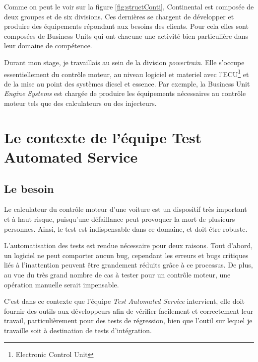 		Comme on peut le voir sur la figure \ref{fig:structConti}, Continental est composée de deux groupes et de six divisions. Ces dernières se chargent de développer et produire des équipements répondant aux besoins des clients. Pour cela elles sont composées de Business Units qui ont chacune une activité bien particulière dans leur domaine de compétence. 

Durant mon stage, je travaillais au sein de la division \textit{powertrain}. Elle s'occupe essentiellement du contrôle moteur, au niveau logiciel et materiel avec l'ECU\footnote{Electronic Control Unit} et de la mise au point des systèmes diesel et essence. Par exemple, la Business Unit \textit{Engine Systems} est chargée de produire les équipements nécessaires au contrôle moteur tels que des calculateurs ou des injecteurs.

	\section{Le contexte de l'équipe Test Automated Service}
		
 		\subsection{Le besoin} \label{besoinTests}
 		Le calculateur du contrôle moteur d'une voiture est un dispositif très important et à haut risque, puisqu'une défaillance peut provoquer la mort de plusieurs personnes. Ainsi, le test est indispensable dans ce domaine, et doit être robuste. 

L'automatisation des tests est rendue nécessaire pour deux raisons. Tout d'abord, un logiciel ne peut comporter aucun bug, cependant les erreurs et bugs critiques liés à l'inattention peuvent être grandement réduits grâce à ce processus. De plus, au vue du très grand nombre de cas à tester pour un contrôle moteur, une opération manuelle serait impensable. 

C'est dans ce contexte que l'équipe \textit{Test Automated Service} intervient, elle doit fournir des outils aux développeurs afin de vérifier facilement et correctement leur travail, particulièrement pour des tests de régression, bien que l'outil sur lequel je travaille soit à destination de tests d'intégration.
